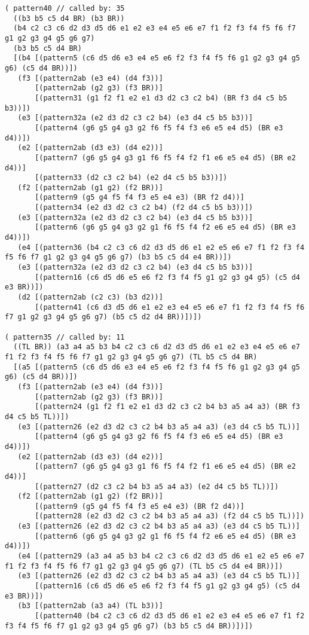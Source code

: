 {\begin{verbatim}
( pattern40 // called by: 35
  ((b3 b5 c5 d4 BR) (b3 BR))
  (b4 c2 c3 c6 d2 d3 d5 d6 e1 e2 e3 e4 e5 e6 e7 f1 f2 f3 f4 f5 f6 f7 g1 g2 g3 g4 g5 g6 g7)
  (b3 b5 c5 d4 BR)
  [(b4 [(pattern5 (c6 d5 d6 e3 e4 e5 e6 f2 f3 f4 f5 f6 g1 g2 g3 g4 g5 g6) (c5 d4 BR))])
   (f3 [(pattern2ab (e3 e4) (d4 f3))]
       [(pattern2ab (g2 g3) (f3 BR))]
       [(pattern31 (g1 f2 f1 e2 e1 d3 d2 c3 c2 b4) (BR f3 d4 c5 b5 b3))])
   (e3 [(pattern32a (e2 d3 d2 c3 c2 b4) (e3 d4 c5 b5 b3))]
       [(pattern4 (g6 g5 g4 g3 g2 f6 f5 f4 f3 e6 e5 e4 d5) (BR e3 d4))])
   (e2 [(pattern2ab (d3 e3) (d4 e2))]
       [(pattern7 (g6 g5 g4 g3 g1 f6 f5 f4 f2 f1 e6 e5 e4 d5) (BR e2 d4))]
       [(pattern33 (d2 c3 c2 b4) (e2 d4 c5 b5 b3))])
   (f2 [(pattern2ab (g1 g2) (f2 BR))]
       [(pattern9 (g5 g4 f5 f4 f3 e5 e4 e3) (BR f2 d4))]
       [(pattern34 (e2 d3 d2 c3 c2 b4) (f2 d4 c5 b5 b3))])
   (e3 [(pattern32a (e2 d3 d2 c3 c2 b4) (e3 d4 c5 b5 b3))]
       [(pattern6 (g6 g5 g4 g3 g2 g1 f6 f5 f4 f2 e6 e5 e4 d5) (BR e3 d4))])
   (e4 [(pattern36 (b4 c2 c3 c6 d2 d3 d5 d6 e1 e2 e5 e6 e7 f1 f2 f3 f4 f5 f6 f7 g1 g2 g3 g4 g5 g6 g7) (b3 b5 c5 d4 e4 BR))])
   (e3 [(pattern32a (e2 d3 d2 c3 c2 b4) (e3 d4 c5 b5 b3))]
       [(pattern16 (c6 d5 d6 e5 e6 f2 f3 f4 f5 g1 g2 g3 g4 g5) (c5 d4 e3 BR))])
   (d2 [(pattern2ab (c2 c3) (b3 d2))]
       [(pattern41 (c6 d3 d5 d6 e1 e2 e3 e4 e5 e6 e7 f1 f2 f3 f4 f5 f6 f7 g1 g2 g3 g4 g5 g6 g7) (b5 c5 d2 d4 BR))])]) 

( pattern35 // called by: 11
  ((TL BR)) (a3 a4 a5 b3 b4 c2 c3 c6 d2 d3 d5 d6 e1 e2 e3 e4 e5 e6 e7 f1 f2 f3 f4 f5 f6 f7 g1 g2 g3 g4 g5 g6 g7) (TL b5 c5 d4 BR)
  [(a5 [(pattern5 (c6 d5 d6 e3 e4 e5 e6 f2 f3 f4 f5 f6 g1 g2 g3 g4 g5 g6) (c5 d4 BR))])
   (f3 [(pattern2ab (e3 e4) (d4 f3))]
       [(pattern2ab (g2 g3) (f3 BR))]
       [(pattern24 (g1 f2 f1 e2 e1 d3 d2 c3 c2 b4 b3 a5 a4 a3) (BR f3 d4 c5 b5 TL))])
   (e3 [(pattern26 (e2 d3 d2 c3 c2 b4 b3 a5 a4 a3) (e3 d4 c5 b5 TL))]
       [(pattern4 (g6 g5 g4 g3 g2 f6 f5 f4 f3 e6 e5 e4 d5) (BR e3 d4))])
   (e2 [(pattern2ab (d3 e3) (d4 e2))]
       [(pattern7 (g6 g5 g4 g3 g1 f6 f5 f4 f2 f1 e6 e5 e4 d5) (BR e2 d4))]
       [(pattern27 (d2 c3 c2 b4 b3 a5 a4 a3) (e2 d4 c5 b5 TL))])
   (f2 [(pattern2ab (g1 g2) (f2 BR))]
       [(pattern9 (g5 g4 f5 f4 f3 e5 e4 e3) (BR f2 d4))]
       [(pattern28 (e2 d3 d2 c3 c2 b4 b3 a5 a4 a3) (f2 d4 c5 b5 TL))])
   (e3 [(pattern26 (e2 d3 d2 c3 c2 b4 b3 a5 a4 a3) (e3 d4 c5 b5 TL))]
       [(pattern6 (g6 g5 g4 g3 g2 g1 f6 f5 f4 f2 e6 e5 e4 d5) (BR e3 d4))])
   (e4 [(pattern29 (a3 a4 a5 b3 b4 c2 c3 c6 d2 d3 d5 d6 e1 e2 e5 e6 e7 f1 f2 f3 f4 f5 f6 f7 g1 g2 g3 g4 g5 g6 g7) (TL b5 c5 d4 e4 BR))])
   (e3 [(pattern26 (e2 d3 d2 c3 c2 b4 b3 a5 a4 a3) (e3 d4 c5 b5 TL))]
       [(pattern16 (c6 d5 d6 e5 e6 f2 f3 f4 f5 g1 g2 g3 g4 g5) (c5 d4 e3 BR))])
   (b3 [(pattern2ab (a3 a4) (TL b3))]
       [(pattern40 (b4 c2 c3 c6 d2 d3 d5 d6 e1 e2 e3 e4 e5 e6 e7 f1 f2 f3 f4 f5 f6 f7 g1 g2 g3 g4 g5 g6 g7) (b3 b5 c5 d4 BR))])])


\end{verbatim}}
